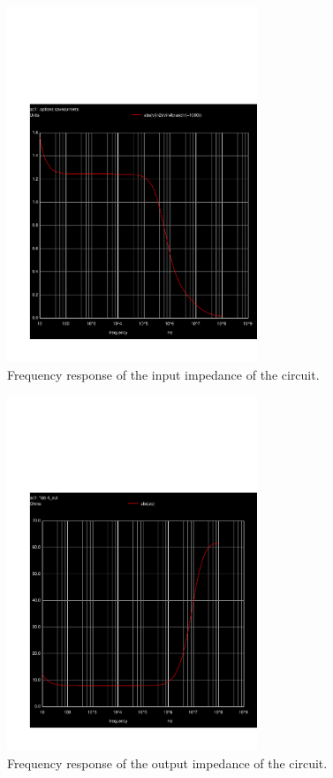 \begin{figure}[h!] \centering
\includegraphics[width=7.5cm]{../sim/zin.pdf}
\caption{Frequency response of the input impedance of the circuit.}
\label{fig:input impedance}
\end{figure}

\begin{figure}[h!] \centering
\includegraphics[width=7.5cm]{../sim/zout.pdf}
\caption{Frequency response of the output impedance of the circuit.}
\label{fig: output impedance}
\end{figure}



